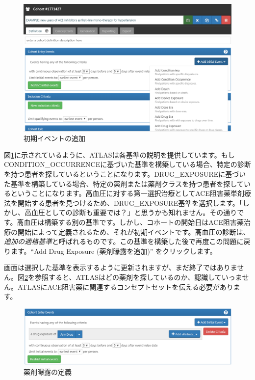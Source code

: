 \documentclass[
  11pt]{book}
\theoremstyle{definition}
\theoremstyle{definition}
\theoremstyle{definition}
\theoremstyle{definition}
\theoremstyle{remark}
\begin{document}
\begin{figure}

{\centering \includegraphics[width=1\linewidth]{images/Cohorts/ATLAS-initialevent} 

}

\caption{初期イベントの追加}\label{fig:ATLASinitialevent}
\end{figure}

図\ref{fig:ATLASinitialevent}に示されているように、ATLASは各基準の説明を提供しています。もしCONDITION\_OCCURRENCEに基づいた基準を構築している場合、特定の診断を持つ患者を探しているということになります。DRUG\_EXPOSUREに基づいた基準を構築している場合、特定の薬剤または薬剤クラスを持つ患者を探しているということになります。高血圧に対する第一選択治療としてACE阻害薬単剤療法を開始する患者を見つけるため、DRUG\_EXPOSURE基準を選択します。「しかし、高血圧としての診断も重要では？」と思うかも知れません。その通りです。高血圧は構築する別の基準です。しかし、コホートの開始日はACE阻害薬治療の開始によって定義されるため、それが初期イベントです。高血圧の診断は、\emph{追加の適格基準}と呼ばれるものです。この基準を構築した後で再度この問題に戻ります。``Add Drug Exposure (薬剤曝露を追加)'' をクリックします。

画面は選択した基準を表示するように更新されますが、まだ終了ではありません。図\ref{fig:ATLASdrugexposure}を参照すると、ATLASはどの薬剤を探しているのか、認識していっません。ATLASにACE阻害薬に関連するコンセプトセットを伝える必要があります。

\begin{figure}

{\centering \includegraphics[width=1\linewidth]{images/Cohorts/ATLAS-drugexposure} 

}

\caption{薬剤曝露の定義}\label{fig:ATLASdrugexposure}
\end{figure}
\end{document}
